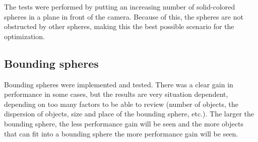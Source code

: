 			The tests were performed by putting an increasing number of
			solid-colored spheres in a plane in front of the camera. Because of
			this, the spheres are not obstructed by other spheres, making this
			the best possible scenario for the optimization.

		\subsection{Bounding spheres}

			Bounding spheres were implemented and tested. There was a clear
			gain in performance in some cases, but the results are very situation dependent, 
			depending on too many factors to be able to review (number of objects, 
			the dispersion of objects, size and place of the bounding sphere, etc.). 
			The larger the bounding sphere, the less performance gain will be seen 
			and the more objects that can fit into a bounding sphere the more performance 
			gain will be seen. 
